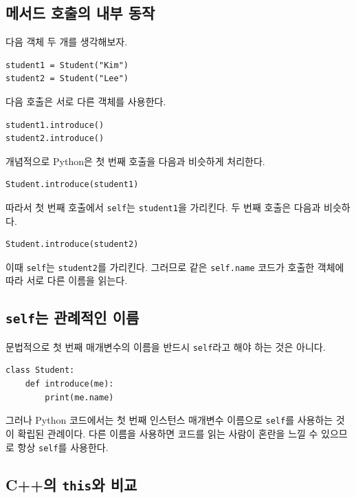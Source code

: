 \documentclass[11pt,a4paper]{article}
\begin{document}
\subsection{메서드 호출의 내부 동작}

다음 객체 두 개를 생각해보자.

\begin{lstlisting}
student1 = Student("Kim")
student2 = Student("Lee")
\end{lstlisting}

다음 호출은 서로 다른 객체를 사용한다.

\begin{lstlisting}
student1.introduce()
student2.introduce()
\end{lstlisting}

개념적으로 Python은 첫 번째 호출을 다음과 비슷하게 처리한다.

\begin{lstlisting}
Student.introduce(student1)
\end{lstlisting}

따라서 첫 번째 호출에서 \texttt{self}는 \texttt{student1}을 가리킨다. 두 번째 호출은 다음과 비슷하다.

\begin{lstlisting}
Student.introduce(student2)
\end{lstlisting}

이때 \texttt{self}는 \texttt{student2}를 가리킨다. 그러므로 같은 \texttt{self.name} 코드가 호출한 객체에 따라 서로 다른 이름을 읽는다.

\subsection{\texttt{self}는 관례적인 이름}

문법적으로 첫 번째 매개변수의 이름을 반드시 \texttt{self}라고 해야 하는 것은 아니다.

\begin{lstlisting}
class Student:
    def introduce(me):
        print(me.name)
\end{lstlisting}

그러나 Python 코드에서는 첫 번째 인스턴스 매개변수 이름으로 \texttt{self}를 사용하는 것이 확립된 관례이다. 다른 이름을 사용하면 코드를 읽는 사람이 혼란을 느낄 수 있으므로 항상 \texttt{self}를 사용한다.

\subsection{C++의 \texttt{this}와 비교}
\end{document}
